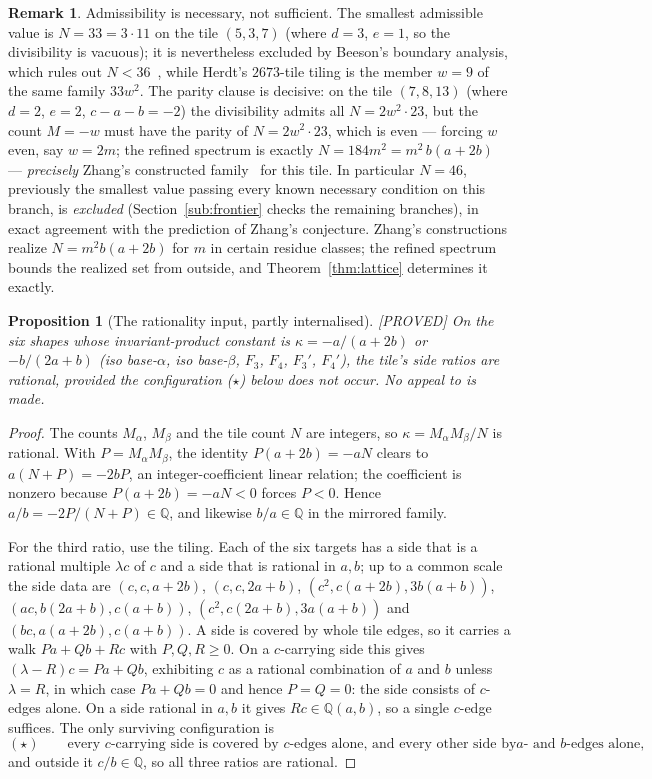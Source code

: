 \documentclass[11pt,reqno]{amsart}
\theoremstyle{plain}
\newtheorem{proposition}[theorem]{Proposition}
\theoremstyle{definition}
\newtheorem{remark}[theorem]{Remark}
\newcommand{\Q}{\mathbb{Q}}
\newcommand{\lab}[1]{\hfill\textnormal{\footnotesize\textsc{[#1]}}}
\begin{document}
\begin{remark}\label{rem:necessary}
Admissibility is necessary, not sufficient. The smallest admissible value is $N=33=3\cdot 11$ on
the tile $(5,3,7)$ (where $d=3$, $e=1$, so the divisibility is vacuous); it is nevertheless
excluded by Beeson's boundary analysis, which rules out $N<36$~\cite{BeesonIso}, while Herdt's
$2673$-tile tiling is the member $w=9$ of the same family $33w^2$. The parity clause is decisive: on the tile $(7,8,13)$ (where $d=2$, $e=2$, $c-a-b=-2$) the
divisibility admits all $N=2w^2\cdot23$, but the count $M=-w$ must have the parity of
$N=2w^2\cdot 23$, which is even --- forcing $w$ even, say $w=2m$; the refined spectrum is exactly
$N=184m^2=m^2\,b(a+2b)$ --- \emph{precisely} Zhang's
constructed family~\cite{Zhang} for this tile. In particular $N=46$, previously the smallest value
passing every known necessary condition on this branch, is \emph{excluded} (Section~\ref{sub:frontier}
checks the remaining branches), in exact agreement with the prediction of Zhang's conjecture.
Zhang's constructions realize $N=m^2b(a+2b)$ for $m$ in certain residue classes; the refined
spectrum bounds the realized set from outside, and Theorem~\ref{thm:lattice} determines it
exactly.
\end{remark}

\begin{proposition}[The rationality input, partly internalised]\label{prop:ratfree}\lab{PROVED}
On the six shapes whose invariant-product constant is $\kappa=-a/(a+2b)$ or $-b/(2a+b)$
\textup{(iso base-$\alpha$, iso base-$\beta$, $F_3$, $F_4$, $F_3'$, $F_4'$)}, the tile's side ratios
are rational, provided the configuration \textup{(}$\star$\textup{)} below does not occur. No
appeal to \cite{BeesonZhang} is made.
\end{proposition}

\begin{proof}
The counts $M_\alpha$, $M_\beta$ and the tile count $N$ are integers, so
$\kappa=M_\alpha M_\beta/N$ is rational. With $P=M_\alpha M_\beta$, the identity
$P(a+2b)=-aN$ clears to $a(N+P)=-2bP$, an integer-coefficient linear relation; the coefficient is
nonzero because $P(a+2b)=-aN<0$ forces $P<0$. Hence $a/b=-2P/(N+P)\in\Q$, and likewise
$b/a\in\Q$ in the mirrored family.

For the third ratio, use the tiling. Each of the six targets has a side that is a rational multiple
$\lambda c$ of $c$ and a side that is rational in $a,b$; up to a common scale the side data are
$(c,c,a+2b)$, $(c,c,2a+b)$, $(c^2,c(a+2b),3b(a+b))$, $(ac,b(2a+b),c(a+b))$,
$(c^2,c(2a+b),3a(a+b))$ and $(bc,a(a+2b),c(a+b))$. A side is covered by whole tile edges, so it
carries a walk $Pa+Qb+Rc$ with $P,Q,R\ge0$. On a $c$-carrying side this gives
$(\lambda-R)c=Pa+Qb$, exhibiting $c$ as a rational combination of $a$ and $b$ unless
$\lambda=R$, in which case $Pa+Qb=0$ and hence $P=Q=0$: the side consists of $c$-edges alone. On a
side rational in $a,b$ it gives $Rc\in\Q(a,b)$, so a single $c$-edge suffices. The only surviving
configuration is
\[
(\star)\qquad\text{every $c$-carrying side is covered by $c$-edges alone, and every other side by
$a$- and $b$-edges alone,}
\]
and outside it $c/b\in\Q$, so all three ratios are rational.
\end{proof}
\end{document}
